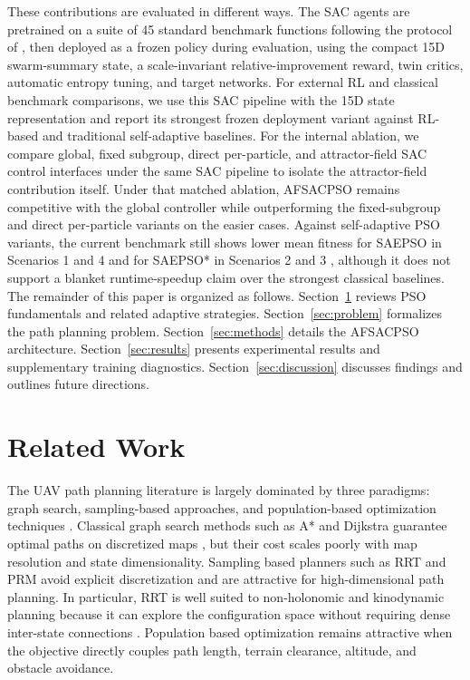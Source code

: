 \documentclass[final,5p,times]{elsarticle}
\begin{document}
These contributions are evaluated in different ways.
The SAC agents are pretrained on a suite of 45 standard benchmark functions following the protocol of \cite{vonEschwege2024Soft}, then deployed as a frozen policy during evaluation, using the compact 15D swarm-summary state, a scale-invariant relative-improvement reward, twin critics, automatic entropy tuning, and target networks.
For external RL and classical benchmark comparisons, we use this SAC pipeline with the 15D state representation and report its strongest frozen deployment variant against RL-based and traditional self-adaptive baselines.
For the internal ablation, we compare global, fixed subgroup, direct per-particle, and attractor-field SAC control interfaces under the same SAC pipeline to isolate the attractor-field contribution itself.
Under that matched ablation, AFSACPSO remains competitive with the global controller while outperforming the fixed-subgroup and direct per-particle variants on the easier cases.
Against self-adaptive PSO variants, the current benchmark still shows lower mean fitness for SAEPSO in Scenarios 1 and 4 and for SAEPSO* in Scenarios 2 and 3 \cite{Liu2025A}, although it does not support a blanket runtime-speedup claim over the strongest classical baselines.
The remainder of this paper is organized as follows.
Section~\ref{sec:background} reviews PSO fundamentals and related adaptive strategies.
Section~\ref{sec:problem} formalizes the path planning problem.
Section~\ref{sec:methods} details the AFSACPSO architecture.
Section~\ref{sec:results} presents experimental results and supplementary training diagnostics.
Section~\ref{sec:discussion} discusses findings and outlines future directions.

\section{Related Work}
\label{sec:background} 
The UAV path planning literature is largely dominated by three paradigms: graph search, sampling-based approaches, and population-based optimization techniques \cite{AitSaadi2022UAV, Zhou2025A}.
Classical graph search methods such as A* and Dijkstra guarantee optimal paths on discretized maps \cite{Hart1968A}, but their cost scales poorly with map resolution and state dimensionality.
Sampling based planners such as RRT and PRM avoid explicit discretization and are attractive for high-dimensional path planning. In particular, RRT is well suited to non-holonomic and kinodynamic planning because it can explore the configuration space without requiring dense inter-state connections \cite{Karur2021A}.
Population based optimization remains attractive when the objective directly couples path length, terrain clearance, altitude, and obstacle avoidance.
\end{document}
